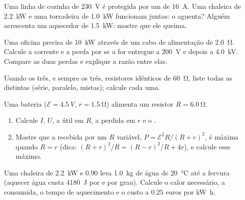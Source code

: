 \begin{exercise}[$\star\star$]\label{exo:g11:circuits-and-power:10}
Uma linha de cozinha de \qty{230}{V} é protegida por um  de
\qty{16}{A}. Uma chaleira de \qty{2.2}{kW} e uma torradeira de
\qty{1.0}{kW} funcionam juntas: o  aguenta? Alguém acrescenta um
aquecedor de \qty{1.5}{kW}: mostre que ele queima.
\end{exercise}

\begin{exercise}[$\star\star$]\label{exo:g11:circuits-and-power:11}
Uma oficina precisa de \qty{10}{kW} através de um cabo de alimentação de
 \qty{2.0}{\ohm}. Calcule a corrente e a perda por  se a  for entregue a \qty{200}{V} e depois a \qty{4.0}{kV}.
Compare as duas perdas e explique a razão entre elas.
\end{exercise}

\begin{exercise}[$\star\star\star$]\label{exo:g11:circuits-and-power:12}
Usando os três, e sempre os três, resistores idênticos de
\qty{60}{\ohm}, liste todas as  distintas
(série, paralelo, mistas); calcule cada uma.
\end{exercise}

\begin{exercise}[$\star\star\star$]\label{exo:g11:circuits-and-power:13}
Uma bateria ($\mathcal{E} = \qty{4.5}{V}$, $r = \qty{1.5}{\ohm}$)
alimenta um resistor $R = \qty{6.0}{\ohm}$.
\begin{enumerate}
  \item Calcule $I$, $U$, a  útil em $R$, a  perdida em
        $r$ e o .
  \item Mostre que a  recebida por um $R$ variável,
        $P = \mathcal{E}^2 R/(R+r)^2$, é máxima quando $R = r$ (dica:
        $(R+r)^2/R = (R-r)^2/R + 4r$), e calcule esse máximo.
\end{enumerate}
\end{exercise}

\begin{exercise}[$\star\star\star$]\label{exo:g11:circuits-and-power:14}
Uma chaleira de \qty{2.2}{kW} e  $0.90$ leva \qty{1.0}{kg} de
água de \qty{20}{\degreeCelsius} até a fervura (aquecer água custa
\qty{4180}{J} por  e por grau). Calcule o calor necessário, a
 consumida, o tempo de aquecimento e o custo a $0.25$
euros por \unit{kW.h}.
\end{exercise}

